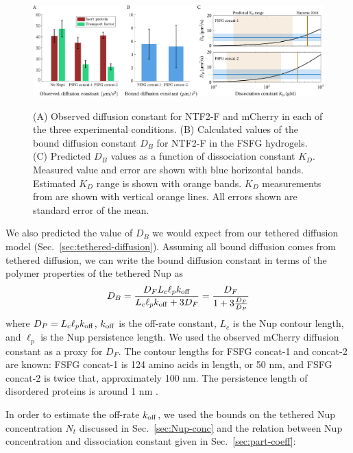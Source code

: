 \begin{figure}[t!]
\caption[Observed diffusion constants and NTF2 bound diffusion.]{(A) Observed diffusion constant for NTF2-F and mCherry in each of the three experimental conditions. (B) Calculated values of the bound diffusion constant $D_B$ for NTF2-F in the FSFG hydrogels. (C) Predicted $D_B$ values as a function of dissociation constant $K_D$.  Measured value and error are shown with blue horizontal bands.  Estimated $K_D$ range is shown with orange bands.  $K_D$ measurements from \cite{hayama18} are shown with vertical orange lines.  All errors shown are standard error of the mean.}
\centering
\includegraphics[width=\textwidth]{figs/ch04/bound-diffusion}
\label{fig:bound-diffusion}
\end{figure} 

We also predicted the value of $D_B$ we would expect from our tethered diffusion model (Sec.~\ref{sec:tethered-diffusion}).  Assuming all bound diffusion comes from tethered diffusion, we can write the bound diffusion constant in terms of the polymer properties of the tethered Nup as
\begin{equation}\label{eq:dbound-ch4}
  D_B = \frac{D_F L_c \ell_p
    k_{\mathrm{off}}}{L_c \ell_p k_{\mathrm{off}} + 3D_F} =
  \frac{D_F}{1+3\frac{D_F}{D_{P}}}
\end{equation}
where $D_P = L_c \ell_p k_{\mathrm{off}}$, $k_{\rm off}$ is the off-rate constant, $L_c$ is the Nup contour length, and $\ell_p$ is the Nup persistence length.  We used the observed mCherry diffusion constant as a proxy for $D_F$.  The contour lengths for FSFG concat-1 and concat-2 are known: FSFG concat-1 is 124 amino acids in length, or 50 nm, and FSFG concat-2 is twice that, approximately 100 nm.  The persistence length of disordered proteins is around 1 nm \cite{receveur-brechot12}.

In order to estimate the off-rate $k_{\rm off}$, we used the bounds on the tethered Nup concentration $N_t$ discussed in Sec.~\ref{sec:Nup-conc} and the relation between Nup concentration and dissociation constant given in Sec.~\ref{sec:part-coeff}:

